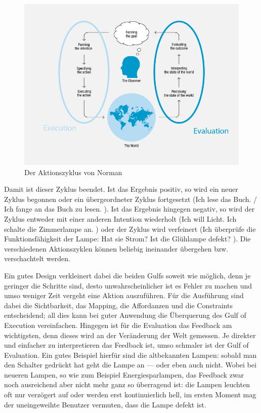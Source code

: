 \documentclass[parskip,headsepline, headtopline, %
footsepline, oneside, 12pt, headings=small]{scrreprt}
\begin{document}
\begin{figure}
\includegraphics[width=\textwidth]{images/ActionCycle.png}
\caption{Der Aktionszyklus von Norman}
\label{fig:action}
\end{figure}

Damit ist dieser Zyklus beendet. Ist das Ergebnis positiv, so wird ein neuer Zyklus begonnen oder ein übergeordneter Zyklus fortgesetzt (\glqq Ich lese das Buch. / Ich fange an das Buch zu lesen. \grqq). Ist das Ergebnis hingegen negativ, so wird der Zyklus entweder mit einer anderen Intention wiederholt (\glqq Ich will Licht. \textrightarrow Ich schalte die Zimmerlampe an. \grqq) oder der Zyklus wird verfeinert (\glqq Ich überprüfe die Funktionsfähigkeit der Lampe: Hat sie Strom? Ist die Glühlampe defekt?  \grqq). Die verschiedenen Aktionszyklen können beliebig ineinander übergehen bzw. verschachtelt werden. 

Ein gutes Design verkleinert dabei die beiden Gulfs soweit wie möglich, denn je geringer die Schritte sind, desto unwahrscheinlicher ist es Fehler zu machen und umso weniger Zeit vergeht eine Aktion auszuführen. Für die Ausführung sind dabei die Sichtbarkeit, das Mapping, die Affordanzen und die Constraints entscheidend; all dies kann bei guter Anwendung die Überquerung des Gulf of Execution vereinfachen. Hingegen ist für die Evaluation das Feedback am wichtigsten, denn dieses wird an der Veränderung der Welt gemessen. Je direkter und einfacher zu interpretieren das Feedback ist, umso schmaler ist der Gulf of Evaluation. Ein gutes Beispiel hierfür sind die altbekannten Lampen: sobald man den Schalter gedrückt hat geht die Lampe an --- oder eben auch nicht. Wobei bei neueren Lampen, so wie zum Beispiel Energiesparlampen, das Feedback zwar noch ausreichend aber nicht mehr ganz so überragend ist: die Lampen leuchten oft nur verzögert auf oder werden erst kontinuierlich hell, im ersten Moment mag der uneingeweihte Benutzer vermuten, dass die Lampe defekt ist. 
\end{document}
